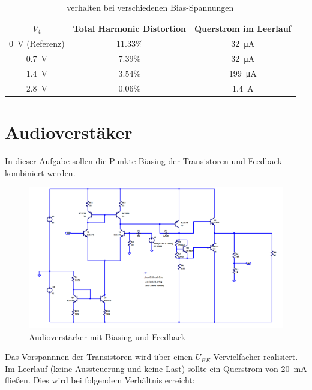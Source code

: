 \begin{table}[H]
    \centering
    \begin{tabular}{|c||c|c|}\hline
         $V_4$ & Total Harmonic Distortion & Querstrom im Leerlauf  \\ \hline \hline
         \SI{0}{\volt} (Referenz)& $11.33\%$ & \SI{32}{\micro \ampere} \\ \hline
         \SI{0.7}{\volt}& $7.39\%$ & \SI{32}{\micro \ampere} \\ \hline
         \SI{1.4}{\volt}& $3.54\%$ & \SI{199}{\micro \ampere} \\ \hline
         \SI{2.8}{\volt}& $0.06\%$ & \SI{1.4}{\ampere} \\ \hline
    \end{tabular} 
    \caption{verhalten bei verschiedenen Bias-Spannungen}
    \label{tab:my_label}
\end{table}

\section{Audioverstäker}

In dieser Aufgabe sollen die Punkte Biasing der Transistoren und Feedback kombiniert werden.

\begin{figure}[H]
    \centering
    \includegraphics[width = \textwidth]{tex/7_Leistungsverstaerker/pictures/AudioAmp.png}
    \caption{Audioverstärker mit Biasing und Feedback}
\end{figure}

Das Vorspannnen der Transistoren wird über einen $U_{BE}$-Vervielfacher realisiert. Im Leerlauf (keine Aussteuerung und keine Last) sollte ein Querstrom von \SI{20}{\milli \ampere} fließen. Dies wird bei folgendem Verhältnis erreicht:

